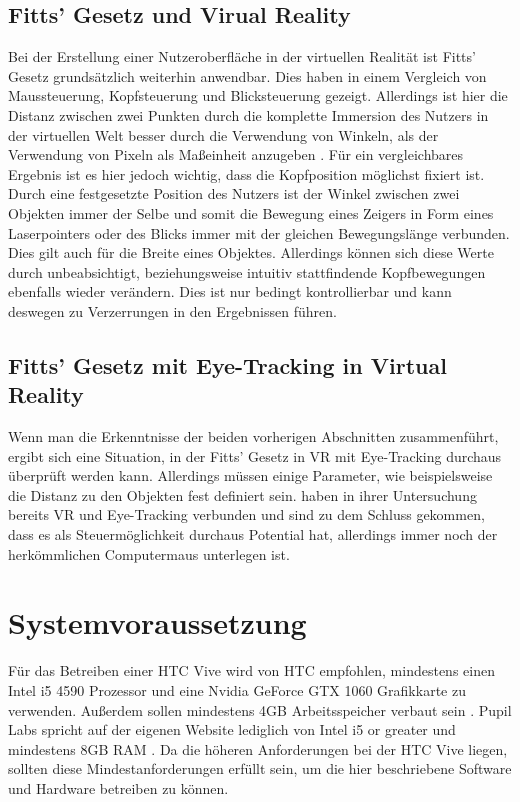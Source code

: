 \subsection{Fitts' Gesetz und Virual Reality}
Bei der Erstellung einer Nutzeroberfläche in der virtuellen Realität ist Fitts' Gesetz grundsätzlich weiterhin anwendbar. Dies haben \citeauthor{Hansen.2018} in einem Vergleich von Maussteuerung, Kopfsteuerung und Blicksteuerung gezeigt.\cite{Hansen.2018} Allerdings ist hier die Distanz zwischen zwei Punkten durch die komplette Immersion des Nutzers in der virtuellen Welt besser durch die Verwendung von Winkeln, als der Verwendung von Pixeln als Maßeinheit anzugeben \cite{Hansen.2018}. Für ein vergleichbares Ergebnis ist es hier jedoch wichtig, dass die Kopfposition möglichst fixiert ist. Durch eine festgesetzte Position des Nutzers ist der Winkel zwischen zwei Objekten immer der Selbe und somit die Bewegung eines Zeigers in Form eines Laserpointers oder des Blicks immer mit der gleichen Bewegungslänge verbunden. Dies gilt auch für die Breite eines Objektes. Allerdings können sich diese Werte durch unbeabsichtigt, beziehungsweise intuitiv stattfindende Kopfbewegungen ebenfalls wieder verändern. Dies ist nur bedingt kontrollierbar und kann deswegen zu Verzerrungen in den Ergebnissen führen. 

\subsection{Fitts' Gesetz mit Eye-Tracking in Virtual Reality}
Wenn man die Erkenntnisse der beiden vorherigen Abschnitten zusammenführt, ergibt sich eine Situation, in der Fitts' Gesetz in VR mit Eye-Tracking durchaus überprüft werden kann. Allerdings müssen einige Parameter, wie beispielsweise die Distanz zu den Objekten fest definiert sein. \citeauthor{Hansen.2018} haben in ihrer Untersuchung bereits VR und Eye-Tracking verbunden und sind zu dem Schluss gekommen, dass es als Steuermöglichkeit durchaus Potential hat, allerdings immer noch der herkömmlichen Computermaus unterlegen ist. \cite{Hansen.2018}

\section{Systemvoraussetzung}
Für das Betreiben einer HTC Vive wird von HTC empfohlen, mindestens einen Intel i5 4590 Prozessor und eine Nvidia GeForce GTX 1060 Grafikkarte zu verwenden. Außerdem sollen mindestens 4GB Arbeitsspeicher verbaut sein \cite{sys.requirements.2020}. Pupil Labs spricht auf der eigenen Website lediglich von \glqq Intel i5 or greater\grqq{} und mindestens 8GB RAM \cite{Pupil.Labs.reqs}. Da die höheren Anforderungen bei der HTC Vive liegen, sollten diese Mindestanforderungen erfüllt sein, um die hier beschriebene Software und Hardware betreiben zu können. 

